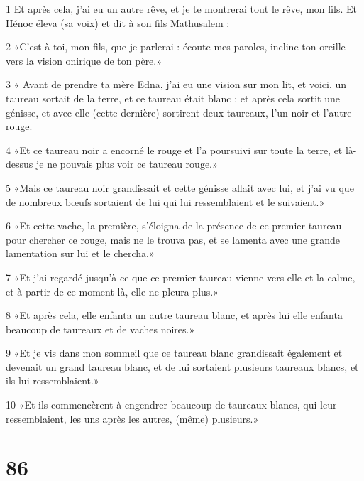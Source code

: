 \par 1 Et après cela, j'ai eu un autre rêve, et je te montrerai tout le rêve, mon fils. Et Hénoc éleva (sa voix) et dit à son fils Mathusalem :
\par 2 «C'est à toi, mon fils, que je parlerai : écoute mes paroles, incline ton oreille vers la vision onirique de ton père.»
\par 3 « Avant de prendre ta mère Edna, j'ai eu une vision sur mon lit, et voici, un taureau sortait de la terre, et ce taureau était blanc ; et après cela sortit une génisse, et avec elle (cette dernière) sortirent deux taureaux, l'un noir et l'autre rouge.
\par 4 «Et ce taureau noir a encorné le rouge et l'a poursuivi sur toute la terre, et là-dessus je ne pouvais plus voir ce taureau rouge.»
\par 5 «Mais ce taureau noir grandissait et cette génisse allait avec lui, et j'ai vu que de nombreux bœufs sortaient de lui qui lui ressemblaient et le suivaient.»
\par 6 «Et cette vache, la première, s'éloigna de la présence de ce premier taureau pour chercher ce rouge, mais ne le trouva pas, et se lamenta avec une grande lamentation sur lui et le chercha.»
\par 7 «Et j'ai regardé jusqu'à ce que ce premier taureau vienne vers elle et la calme, et à partir de ce moment-là, elle ne pleura plus.»
\par 8 «Et après cela, elle enfanta un autre taureau blanc, et après lui elle enfanta beaucoup de taureaux et de vaches noires.»
\par 9 «Et je vis dans mon sommeil que ce taureau blanc grandissait également et devenait un grand taureau blanc, et de lui sortaient plusieurs taureaux blancs, et ils lui ressemblaient.»
\par 10 «Et ils commencèrent à engendrer beaucoup de taureaux blancs, qui leur ressemblaient, les uns après les autres, (même) plusieurs.»

\chapter{86}

